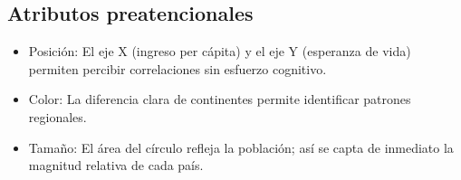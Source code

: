 \documentclass{../../miPlantilla}
\begin{document}
\subsection{Atributos preatencionales}

\begin{itemize}
    \item Posición: El eje X (ingreso per cápita) y el eje Y (esperanza de vida) permiten percibir correlaciones sin esfuerzo cognitivo.
    \item Color: La diferencia clara de continentes permite identificar patrones regionales.
    \item Tamaño: El área del círculo refleja la población; así se capta de inmediato la magnitud relativa de cada país.
\end{itemize}
\end{document}
